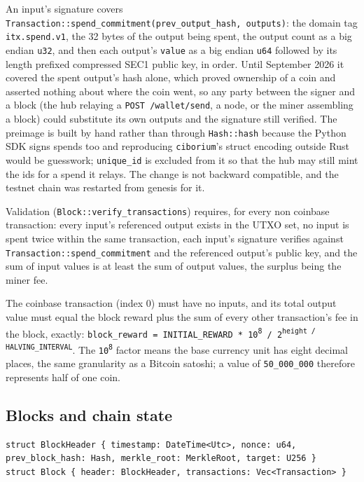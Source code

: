 \documentclass[11pt]{article}
\newcommand{\code}[1]{\texttt{#1}}
\begin{document}
An input's signature covers \code{Transaction::spend\_commitment(prev\_output\_hash, outputs)}: the domain tag \code{itx.spend.v1}, the 32 bytes of the output being spent, the output count as a big endian \code{u32}, and then each output's \code{value} as a big endian \code{u64} followed by its length prefixed compressed SEC1 public key, in order. Until September 2026 it covered the spent output's hash alone, which proved ownership of a coin and asserted nothing about where the coin went, so any party between the signer and a block (the hub relaying a \code{POST /wallet/send}, a node, or the miner assembling a block) could substitute its own outputs and the signature still verified. The preimage is built by hand rather than through \code{Hash::hash} because the Python SDK signs spends too and reproducing \code{ciborium}'s struct encoding outside Rust would be guesswork; \code{unique_id} is excluded from it so that the hub may still mint the ids for a spend it relays. The change is not backward compatible, and the testnet chain was restarted from genesis for it.

Validation (\code{Block::verify_transactions}) requires, for every non coinbase transaction: every input's referenced output exists in the UTXO set, no input is spent twice within the same transaction, each input's signature verifies against \code{Transaction::spend\_commitment} and the referenced output's public key, and the sum of input values is at least the sum of output values, the surplus being the miner fee.

The coinbase transaction (index 0) must have no inputs, and its total output value must equal the block reward plus the sum of every other transaction's fee in the block, exactly: \code{block\_reward = INITIAL\_REWARD * 10\textsuperscript{8} / 2\textsuperscript{height / HALVING\_INTERVAL}}. The \code{10\textsuperscript{8}} factor means the base currency unit has eight decimal places, the same granularity as a Bitcoin satoshi; a value of \code{50\_000\_000} therefore represents half of one coin.

\subsection{Blocks and chain state}

\begin{lstlisting}
struct BlockHeader { timestamp: DateTime<Utc>, nonce: u64, prev_block_hash: Hash, merkle_root: MerkleRoot, target: U256 }
struct Block { header: BlockHeader, transactions: Vec<Transaction> }
\end{lstlisting}
\end{document}
